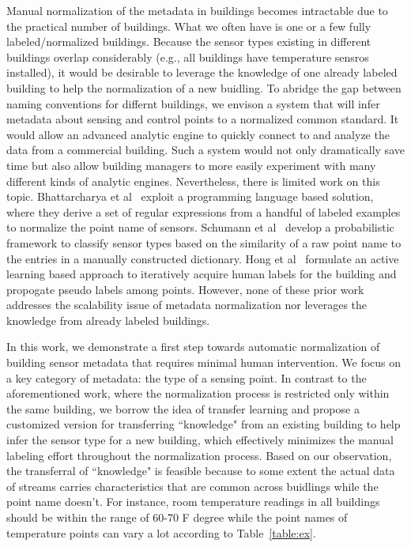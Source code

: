 Manual normalization of the metadata in buildings becomes intractable due to 
the practical number of buildings. What we often have is one or a few fully 
labeled/normalized buildings. Because the sensor types existing in different buildings 
overlap considerably (e.g., all buildings have temperature sensros installed), it 
would be desirable to leverage the knowledge of one already labeled building to 
help the normalization of a new buidling. 
To abridge the gap between naming conventions for differnt buildings, we envison 
a system that will infer metadata about sensing and control points to a normalized 
common standard.
It would allow an advanced analytic engine to quickly connect to and analyze the data 
from a commercial building. Such a system would not only dramatically save time 
but also allow building managers to more easily experiment with many different kinds 
of analytic engines. 
Nevertheless, there is limited work on this topic. 
Bhattarcharya et al~\cite{arka} exploit a programming language based solution, 
where they derive a set of regular expressions from a handful of labeled examples 
to normalize the point name of sensors. 
Schumann et al~\cite{ibm} develop a probabilistic framework to classify sensor types 
based on the similarity of a raw point name to the entries in a manually constructed dictionary. 
Hong et al~\cite{cikm} formulate an active learning based approach to iteratively 
acquire human labels for the building and propogate pseudo labels among points.
However, none of these prior work addresses the scalability issue of metadata 
normalization nor leverages the knowledge from already labeled buildings.

In this work, we demonstrate a first step towards automatic normalization of building 
sensor metadata that requires minimal human intervention. We focus on a key category 
of metadata: the type of a sensing point. In contrast to the aforementioned work, 
where the normalization process is restricted only within the same building, 
we borrow the idea of transfer learning and propose a customized version for transferring 
``knowledge" from an existing building to help infer the sensor type for a new building, which 
effectively minimizes the manual labeling effort throughout the normalization process. 
Based on our observation, the transferral of ``knowledge" is feasible because 
to some extent the actual data of streams carries characteristics that are common 
across buidlings while the point name doesn't. For instance, room temperature 
readings in all buildings should be within the range of 60-70 F degree while 
the point names of temperature points can vary a lot according to 
Table~\ref{table:ex}.

